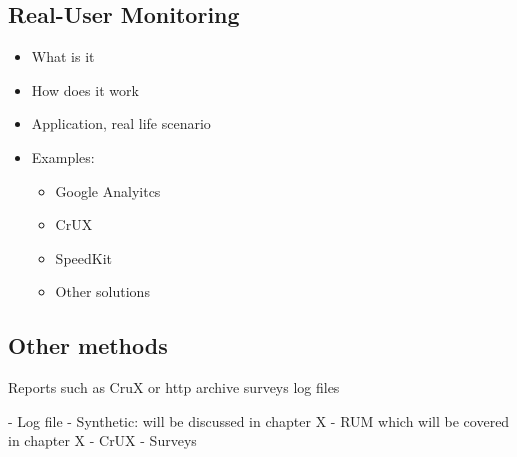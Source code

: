 


\subsection{Real-User Monitoring}

\begin{itemize}
    \item What is it
    \item How does it work
    \item Application, real life scenario
    \item Examples:
    \begin{itemize}
        \item Google Analyitcs
        \item CrUX
        \item SpeedKit
        \item Other solutions
    \end{itemize}
\end{itemize}










\subsection{Other methods}

Reports such as CruX or http archive
surveys
log files



- Log file
- Synthetic: will be discussed in chapter X
- RUM which will be covered in chapter X
- CrUX
- Surveys







